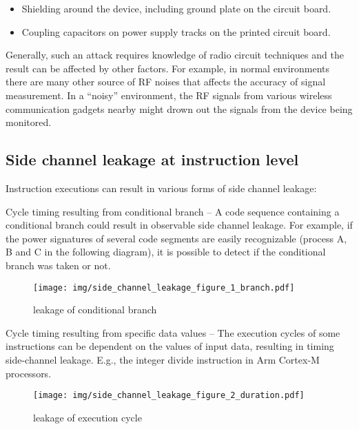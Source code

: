 \documentclass[
  a4paper,
]{report}
\providecommand{\tightlist}{%
  \setlength{\itemsep}{0pt}\setlength{\parskip}{0pt}}
\begin{document}
\begin{itemize}
\tightlist
\item
  Shielding around the device, including ground plate on the circuit
  board.
\item
  Coupling capacitors on power supply tracks on the printed circuit
  board.
\end{itemize}

Generally, such an attack requires knowledge of radio circuit techniques
and the result can be affected by other factors. For example, in normal
environments there are many other source of RF noises that affects the
accuracy of signal measurement. In a ``noisy'' environment, the RF
signals from various wireless communication gadgets nearby might drown
out the signals from the device being monitored.

\hypertarget{side-channel-leakage-at-instruction-level}{%
\subsection{Side channel leakage at instruction
level}\label{side-channel-leakage-at-instruction-level}}

Instruction executions can result in various forms of side channel
leakage:

Cycle timing resulting from conditional branch -- A code sequence
containing a conditional branch could result in observable side channel
leakage. For example, if the power signatures of several code segments
are easily recognizable (process A, B and C in the following diagram),
it is possible to detect if the conditional branch was taken or not.

\begin{figure}
\centering
\texttt{[image: img/side\_channel\_leakage\_figure\_1\_branch.pdf]}
\caption{leakage of conditional branch}
\end{figure}

Cycle timing resulting from specific data values -- The execution cycles
of some instructions can be dependent on the values of input data,
resulting in timing side-channel leakage. E.g., the integer divide
instruction in Arm Cortex-M processors.

\begin{figure}
\centering
\texttt{[image: img/side\_channel\_leakage\_figure\_2\_duration.pdf]}
\caption{leakage of execution cycle}
\end{figure}
\end{document}
